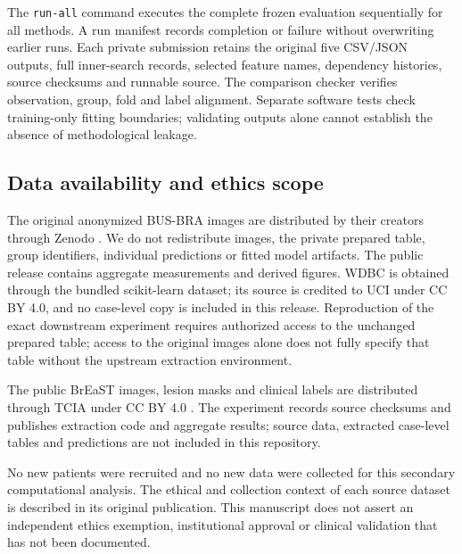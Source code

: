 \documentclass[11pt,a4paper]{article}
\begin{document}
The \texttt{run-all} command executes the complete frozen evaluation sequentially for all methods. A run manifest records completion or failure without overwriting earlier runs. Each private submission retains the original five CSV/JSON outputs, full inner-search records, selected feature names, dependency histories, source checksums and runnable source. The comparison checker verifies observation, group, fold and label alignment. Separate software tests check training-only fitting boundaries; validating outputs alone cannot establish the absence of methodological leakage.

\subsection{Data availability and ethics scope}
The original anonymized BUS-BRA images are distributed by their creators through Zenodo \cite{zenodo}. We do not redistribute images, the private prepared table, group identifiers, individual predictions or fitted model artifacts. The public release contains aggregate measurements and derived figures. WDBC is obtained through the bundled scikit-learn dataset; its source is credited to UCI under CC BY 4.0, and no case-level copy is included in this release. Reproduction of the exact downstream experiment requires authorized access to the unchanged prepared table; access to the original images alone does not fully specify that table without the upstream extraction environment.

The public BrEaST images, lesion masks and clinical labels are distributed through TCIA under CC BY 4.0 \cite{breast}. The experiment records source checksums and publishes extraction code and aggregate results; source data, extracted case-level tables and predictions are not included in this repository.

No new patients were recruited and no new data were collected for this secondary computational analysis. The ethical and collection context of each source dataset is described in its original publication. This manuscript does not assert an independent ethics exemption, institutional approval or clinical validation that has not been documented.
\end{document}
